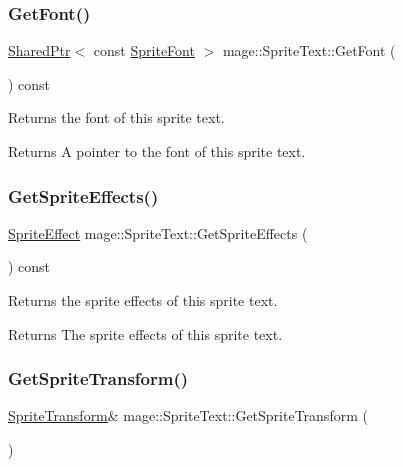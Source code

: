 \subsubsection{\texorpdfstring{Get\+Font()}{GetFont()}}
{\footnotesize\ttfamily \hyperlink{namespacemage_a1e01ae66713838a7a67d30e44c67703e}{Shared\+Ptr}$<$ const \hyperlink{classmage_1_1_sprite_font}{Sprite\+Font} $>$ mage\+::\+Sprite\+Text\+::\+Get\+Font (\begin{DoxyParamCaption}{ }\end{DoxyParamCaption}) const\hspace{0.3cm}{\ttfamily [noexcept]}}

Returns the font of this sprite text.

\begin{DoxyReturn}{Returns}
A pointer to the font of this sprite text. 
\end{DoxyReturn}
\hypertarget{classmage_1_1_sprite_text_a2bd9f195c3c31906c2b3dbf276f5bc97}{}\label{classmage_1_1_sprite_text_a2bd9f195c3c31906c2b3dbf276f5bc97} 
\subsubsection{\texorpdfstring{Get\+Sprite\+Effects()}{GetSpriteEffects()}}
{\footnotesize\ttfamily \hyperlink{namespacemage_a9cfe18123066ba4236f548f9de75d881}{Sprite\+Effect} mage\+::\+Sprite\+Text\+::\+Get\+Sprite\+Effects (\begin{DoxyParamCaption}{ }\end{DoxyParamCaption}) const\hspace{0.3cm}{\ttfamily [noexcept]}}

Returns the sprite effects of this sprite text.

\begin{DoxyReturn}{Returns}
The sprite effects of this sprite text. 
\end{DoxyReturn}
\hypertarget{classmage_1_1_sprite_text_af2d7d48fd0134a9d713c3a4820ac09ba}{}\label{classmage_1_1_sprite_text_af2d7d48fd0134a9d713c3a4820ac09ba} 
\subsubsection{\texorpdfstring{Get\+Sprite\+Transform()}{GetSpriteTransform()}\hspace{0.1cm}{\footnotesize\ttfamily [1/2]}}
{\footnotesize\ttfamily \hyperlink{classmage_1_1_sprite_transform}{Sprite\+Transform}\& mage\+::\+Sprite\+Text\+::\+Get\+Sprite\+Transform (\begin{DoxyParamCaption}{ }\end{DoxyParamCaption})\hspace{0.3cm}{\ttfamily [noexcept]}}

